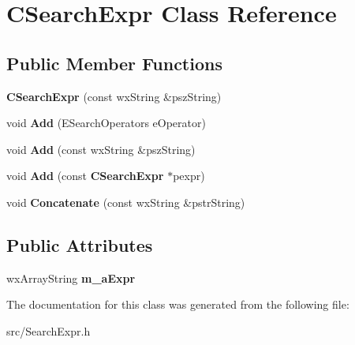 \section{CSearchExpr Class Reference}
\label{classCSearchExpr}
\subsection*{Public Member Functions}
\begin{DoxyCompactItemize}
\item 
{\bfseries CSearchExpr} (const wxString \&pszString)\label{classCSearchExpr_acf82e954570a9305e6deedbacc6c2591}

\item 
void {\bfseries Add} (ESearchOperators eOperator)\label{classCSearchExpr_a343832de3f5345f1d74d2803fa7d65b8}

\item 
void {\bfseries Add} (const wxString \&pszString)\label{classCSearchExpr_afe434e0aa1f432a3ea0c5f50919cc514}

\item 
void {\bfseries Add} (const {\bf CSearchExpr} $\ast$pexpr)\label{classCSearchExpr_ae54492325a45339960763248a549f0c8}

\item 
void {\bfseries Concatenate} (const wxString \&pstrString)\label{classCSearchExpr_a63753b5a37021fc3dc7b19a0c64a795d}

\end{DoxyCompactItemize}
\subsection*{Public Attributes}
\begin{DoxyCompactItemize}
\item 
wxArrayString {\bfseries m\_\-aExpr}\label{classCSearchExpr_a0b93263f806222c86091e96a37bd9f89}

\end{DoxyCompactItemize}


The documentation for this class was generated from the following file:\begin{DoxyCompactItemize}
\item 
src/SearchExpr.h\end{DoxyCompactItemize}
